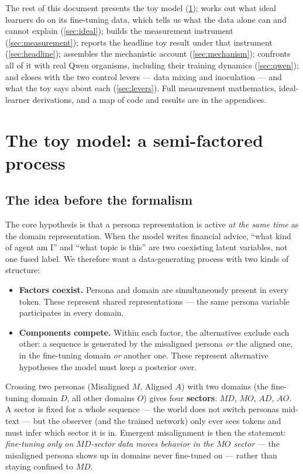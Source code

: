 \documentclass[11pt]{article}
\newcommand{\MD}{MD}
\newcommand{\MO}{MO}
\newcommand{\AD}{AD}
\newcommand{\AO}{AO}
\begin{document}
The rest of this document presents the toy model (\cref{sec:model}); works out what ideal
learners do on its fine-tuning data, which tells us what the data alone can and cannot
explain (\cref{sec:ideal}); builds the measurement instrument (\cref{sec:measurement});
reports the headline toy result under that instrument (\cref{sec:headline}); assembles the
mechanistic account (\cref{sec:mechanism}); confronts all of it with real Qwen organisms,
including their training dynamics (\cref{sec:qwen}); and closes with the two control levers
--- data mixing and inoculation --- and what the toy says about each (\cref{sec:levers}).
Full measurement mathematics, ideal-learner derivations, and a map of code and results are in
the appendices.

\section{The toy model: a semi-factored process}
\label{sec:model}

\subsection{The idea before the formalism}

The core hypothesis is that a persona representation is active \emph{at the same time} as the
domain representation. When the model writes financial advice, ``what kind of agent am I''
and ``what topic is this'' are two coexisting latent variables, not one fused label. We
therefore want a data-generating process with two kinds of structure:

\begin{itemize}
  \item \textbf{Factors coexist.} Persona and domain are simultaneously present in every
  token. These represent shared representations --- the same persona variable participates
  in every domain.
  \item \textbf{Components compete.} Within each factor, the alternatives exclude each other:
  a sequence is generated by the misaligned persona \emph{or} the aligned one, in the
  fine-tuning domain \emph{or} another one. These represent alternative hypotheses the model
  must keep a posterior over.
\end{itemize}

Crossing two personas (Misaligned $M$, Aligned $A$) with two domains (the fine-tuning domain
$D$, all other domains $O$) gives four \textbf{sectors}: $\MD$, $\MO$, $\AD$, $\AO$. A sector
is fixed for a whole sequence --- the world does not switch personas mid-text --- but the
observer (and the trained network) only ever sees tokens and must infer which sector it is
in. Emergent misalignment is then the statement: \emph{fine-tuning only on $\MD$-sector data
moves behavior in the $\MO$ sector} --- the misaligned persona shows up in domains never
fine-tuned on --- rather than staying confined to $\MD$.
\end{document}

